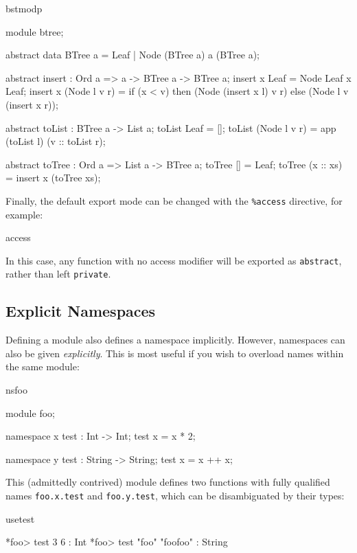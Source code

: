 \begin{SaveVerbatim}{bstmodp}

module btree;

abstract data BTree a = Leaf
                      | Node (BTree a) a (BTree a);

abstract
insert : Ord a => a -> BTree a -> BTree a;
insert x Leaf = Node Leaf x Leaf;
insert x (Node l v r) = if (x < v) then (Node (insert x l) v r)
                                   else (Node l v (insert x r));

abstract
toList : BTree a -> List a;
toList Leaf = [];
toList (Node l v r) = app (toList l) (v :: toList r);

abstract
toTree : Ord a => List a -> BTree a;
toTree [] = Leaf;
toTree (x :: xs) = insert x (toTree xs);

\end{SaveVerbatim}

\noindent
Finally, the default export mode can be changed with the \texttt{\%access} directive,
for example:

\begin{SaveVerbatim}{access}


\end{SaveVerbatim}

\noindent
In this case, any function with no access modifier will be exported as \texttt{abstract},
rather than left \texttt{private}.

\subsection{Explicit Namespaces}

Defining a module also defines a namespace implicitly. However, namespaces can also
be given \emph{explicitly}. This is most useful if you wish to overload names within
the same module:

\begin{SaveVerbatim}{nsfoo}

module foo;

namespace x {
  test : Int -> Int;
  test x = x * 2;
}

namespace y {
  test : String -> String;
  test x = x ++ x; 
}

\end{SaveVerbatim}

\noindent
This (admittedly contrived) module defines two functions with fully qualified names
\texttt{foo.x.test} and \texttt{foo.y.test}, which can be disambiguated by their
types:

\begin{SaveVerbatim}{usetest}

*foo> test 3 
6 : Int
*foo> test "foo" 
"foofoo" : String

\end{SaveVerbatim}


